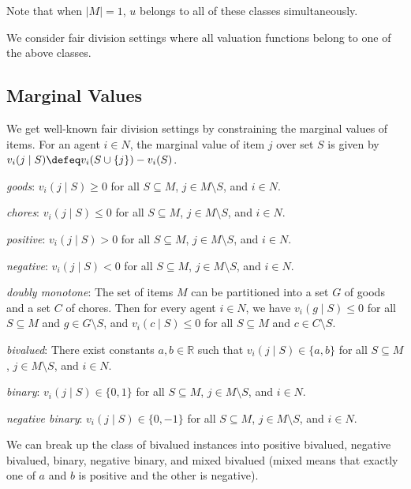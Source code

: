 Note that when $|M|=1$, $u$ belongs to all of these classes simultaneously.

We consider fair division settings where all valuation functions belong to one of the above classes.

\subsection{Marginal Values}

We get well-known fair division settings by constraining the marginal values of items.
For an agent $i \in N$, the marginal value of item $j$ over set $S$
is given by $v_i(j \mid S) \defeq v_i(S \cup \{j\}) - v_i(S)$.

\begin{tightenum}
\item \emph{goods}: $v_i(j \mid S) \ge 0$ for all $S \subseteq M$, $j \in M \setminus S$, and $i \in N$.
\item \emph{chores}: $v_i(j \mid S) \le 0$ for all $S \subseteq M$, $j \in M \setminus S$, and $i \in N$.
\item \emph{positive}: $v_i(j \mid S) > 0$ for all $S \subseteq M$, $j \in M \setminus S$, and $i \in N$.
\item \emph{negative}: $v_i(j \mid S) < 0$ for all $S \subseteq M$, $j \in M \setminus S$, and $i \in N$.
\item \emph{doubly monotone}: The set of items $M$ can be partitioned into a set $G$ of goods and a set $C$ of chores.
    Then for every agent $i \in N$, we have
    $v_i(g \mid S) \le 0$ for all $S \subseteq M$ and $g \in G \setminus S$, and
    $v_i(c \mid S) \le 0$ for all $S \subseteq M$ and $c \in C \setminus S$.
\item \emph{bivalued}: There exist constants $a, b \in \mathbb{R}$ such that
    $v_i(j \mid S) \in \{a, b\}$ for all $S \subseteq M$, $j \in M \setminus S$, and $i \in N$.
\item \emph{binary}: $v_i(j \mid S) \in \{0, 1\}$ for all $S \subseteq M$, $j \in M \setminus S$, and $i \in N$.
\item \emph{negative binary}: $v_i(j \mid S) \in \{0, -1\}$ for all $S \subseteq M$, $j \in M \setminus S$, and $i \in N$.
\end{tightenum}

We can break up the class of bivalued instances into positive bivalued, negative bivalued,
binary, negative binary, and mixed bivalued
(mixed means that exactly one of $a$ and $b$ is positive and the other is negative).
